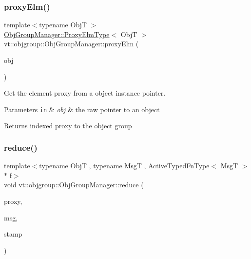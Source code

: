\subsubsection{\texorpdfstring{proxy\+Elm()}{proxyElm()}}
{\footnotesize\ttfamily template$<$typename ObjT $>$ \\
\hyperlink{structvt_1_1objgroup_1_1_obj_group_manager_adba6c8ecb0f4c30e719f1abb995cfc9b}{Obj\+Group\+Manager\+::\+Proxy\+Elm\+Type}$<$ ObjT $>$ vt\+::objgroup\+::\+Obj\+Group\+Manager\+::proxy\+Elm (\begin{DoxyParamCaption}\item[{ObjT $\ast$}]{obj }\end{DoxyParamCaption})}



Get the element proxy from a object instance pointer. 


\begin{DoxyParams}[1]{Parameters}
\mbox{\tt in}  & {\em obj} & the raw pointer to an object\\
\hline
\end{DoxyParams}
\begin{DoxyReturn}{Returns}
indexed proxy to the object group 
\end{DoxyReturn}
\mbox{\label{structvt_1_1objgroup_1_1_obj_group_manager_ae794f79a67e0a916b175ab9853185339}} 
\subsubsection{\texorpdfstring{reduce()}{reduce()}}
{\footnotesize\ttfamily template$<$typename ObjT , typename MsgT , Active\+Typed\+Fn\+Type$<$ Msg\+T $>$ $\ast$ f$>$ \\
void vt\+::objgroup\+::\+Obj\+Group\+Manager\+::reduce (\begin{DoxyParamCaption}\item[{\hyperlink{structvt_1_1objgroup_1_1_obj_group_manager_aea65eef52f240a52210132eef5ce591f}{Proxy\+Type}$<$ ObjT $>$}]{proxy,  }\item[{\hyperlink{namespacevt_ab2b3d506ec8e8d1540aede826d84a239}{Msg\+Shared\+Ptr}$<$ MsgT $>$}]{msg,  }\item[{\hyperlink{namespacevt_1_1collective_1_1reduce_a7b7cb3021ac5654d92825d9fab0250b2}{collective\+::reduce\+::\+Reduce\+Stamp} const \&}]{stamp }\end{DoxyParamCaption})}



